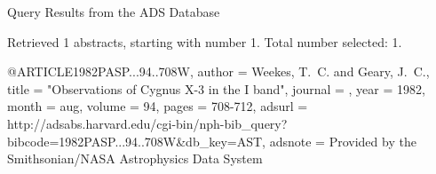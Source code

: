 Query Results from the ADS Database


Retrieved 1 abstracts, starting with number 1.  Total number selected: 1.

@ARTICLE{1982PASP...94..708W,
   author = {{Weekes}, T.~C. and {Geary}, J.~C.},
    title = "{Observations of Cygnus X-3 in the I band}",
  journal = {\pasp},
     year = 1982,
    month = aug,
   volume = 94,
    pages = {708-712},
   adsurl = {http://adsabs.harvard.edu/cgi-bin/nph-bib_query?bibcode=1982PASP...94..708W&db_key=AST},
  adsnote = {Provided by the Smithsonian/NASA Astrophysics Data System}
}


